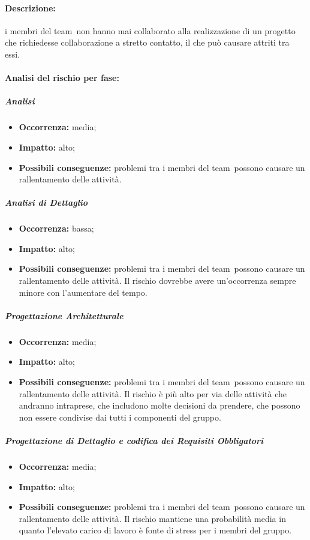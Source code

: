 \documentclass[../PianoProgetto.tex]{subfiles}
\begin{document}
	\paragraph*{Descrizione:} i membri del team\g\ non hanno mai collaborato alla realizzazione di un progetto che richiedesse collaborazione a stretto contatto, il che può causare attriti tra essi.
	
	\paragraph*{Analisi del rischio per fase:} 

		\subparagraph*{Analisi}
			\begin{itemize}[label={-}]
				\item \textbf{Occorrenza:} media;
				\item \textbf{Impatto:} alto;
				\item \textbf{Possibili conseguenze:} problemi tra i membri del team\g\ possono causare un rallentamento delle attività.
			\end{itemize}
			
		\subparagraph*{Analisi di Dettaglio}
			\begin{itemize}[label={-}]
				\item \textbf{Occorrenza:} bassa;
				\item \textbf{Impatto:} alto;
				\item \textbf{Possibili conseguenze:} problemi tra i membri del team\g\ possono causare un rallentamento delle attività. Il rischio dovrebbe avere un'occorrenza sempre minore con l'aumentare del tempo.
			\end{itemize}
			
		\subparagraph*{Progettazione Architetturale}
			\begin{itemize}[label={-}]
				\item \textbf{Occorrenza:} media;
				\item \textbf{Impatto:} alto;
				\item \textbf{Possibili conseguenze:} problemi tra i membri del team\g\ possono causare un rallentamento delle attività. Il rischio è più alto per via delle attività che andranno intraprese, che includono molte decisioni da prendere, che possono non essere condivise dai tutti i componenti del gruppo. 
			\end{itemize}
			
		\subparagraph*{Progettazione di Dettaglio e codifica dei Requisiti Obbligatori}
			\begin{itemize}[label={-}]
				\item \textbf{Occorrenza:} media;
				\item \textbf{Impatto:} alto;
				\item \textbf{Possibili conseguenze:} problemi tra i membri del team\g\ possono causare un rallentamento delle attività. Il rischio mantiene una probabilità media in quanto l'elevato carico di lavoro è fonte di stress per i membri del gruppo. 
			\end{itemize}
			
\end{document}
